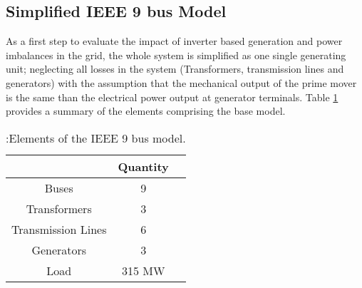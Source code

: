 \subsection{Simplified IEEE 9 bus Model}
\label{ssec:simpleieee}
As a first step to evaluate the impact of inverter based generation and power imbalances in the grid, the whole system is simplified as one single generating unit; neglecting all losses in the system (Transformers, transmission lines and generators) with the assumption that the mechanical output of the prime mover is the same than the electrical power output at generator terminals. Table \ref{tb:gridelements} provides a summary of the elements comprising the base model.\\




\begin{table}[h]
	\caption{\label{tb:gridelements}:Elements of the IEEE 9 bus model.}
	\centering
	\begin{tabular}{ccc}
		\toprule
		\textbf{}	& \textbf{Quantity}\\
		\midrule
		Buses		& 9			\\
		Transformers		& 3			\\
 		Transmission Lines			& 6 \\
		Generators			& 3 \\
 		Load			&  315 MW  \\
		\bottomrule
	\end{tabular}
\end{table}





